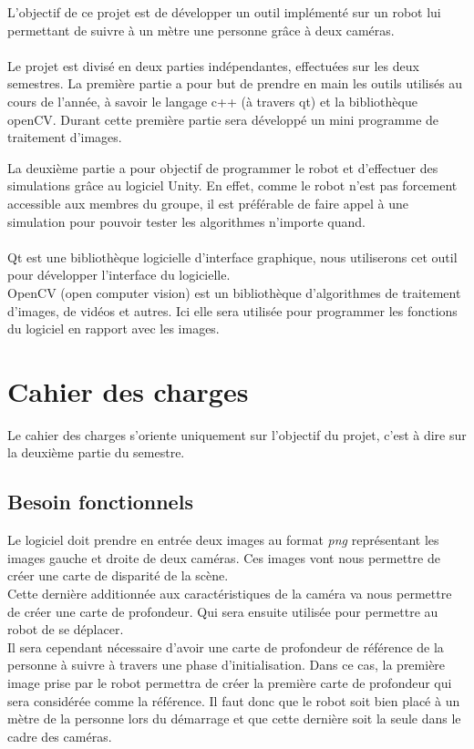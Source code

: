 \documentclass[12pt,a4paper]{report}
\begin{document}
L'objectif de ce projet est de développer un outil implémenté sur un robot lui permettant de suivre à un mètre une personne grâce à deux caméras.\\\\

Le projet est divisé en deux parties indépendantes, effectuées sur les deux semestres. 
La première partie a pour but de prendre en main les outils utilisés au cours de l'année, à savoir le langage c++ (à travers qt) et la bibliothèque openCV.
Durant cette première partie sera développé un mini programme de traitement d'images. 

La deuxième partie a pour objectif de programmer le robot et d'effectuer des simulations grâce au logiciel Unity. En effet, comme le robot n'est pas forcement accessible aux membres du groupe, il est préférable de faire appel à une simulation pour pouvoir tester les algorithmes n'importe quand.\\\\

Qt est une bibliothèque logicielle d'interface graphique, nous utiliserons cet outil pour développer l'interface du logicielle.\\

OpenCV (open computer vision) est un bibliothèque d'algorithmes de traitement d'images, de vidéos et autres. Ici elle sera utilisée pour programmer les fonctions du logiciel en rapport avec les images.\\


\section{Cahier des charges}
Le cahier des charges s'oriente uniquement sur l'objectif du projet, c'est à dire sur la deuxième partie du semestre.
\subsection{Besoin fonctionnels}
	Le logiciel doit prendre en entrée deux images au format \textit{png} représentant les images gauche et droite de deux caméras.
	Ces images vont nous permettre de créer une carte de disparité de la scène.\\	
	Cette dernière additionnée aux caractéristiques de la caméra va nous permettre de créer une carte de profondeur. Qui sera ensuite utilisée pour permettre au robot de se déplacer.\\
	Il sera cependant nécessaire d'avoir une carte de profondeur de référence de la personne à suivre à travers une phase d'initialisation. Dans ce cas, la première image prise par le robot permettra de créer la première carte de profondeur qui sera considérée comme la référence. Il faut donc que le robot soit bien placé à un mètre de la personne lors du démarrage et que cette dernière soit la seule dans le cadre des caméras.
\end{document}
